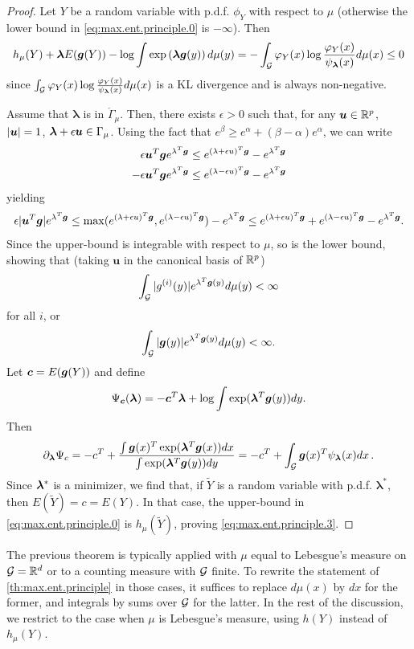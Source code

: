 \begin{proof}


Let $Y$ be a random variable with p.d.f. $\phi_Y$ with respect to $\mu$ (otherwise the lower bound in \cref{eq:max.ent.principle.0} is $-\infty$). 
Then
\[
h_\mu(Y) + \bm{\lambda} E({\bm{g}}(Y)) - \log \int \exp\left(\bm{\lambda} {\bm{g}}(y)\right) d\mu(y) = - \int_{\mathcal G} \varphi_Y(x) \log \frac{\varphi_Y(x)}{\psi_{\bm\lambda}(x)} d\mu(x) \leq 0
\]
since $\int_{\mathcal G} \varphi_Y(x) \log \frac{\varphi_Y(x)}{\psi_{\bm\lambda}(x)} d\mu(x)$ is a KL divergence and is always non-negative.

Assume that $\boldsymbol\lambda$ is in $\mathring \Gamma_\mu$. Then, there exists $\epsilon > 0$ such that, for any ${\bm{u}}\in {\mathbb{R}}^p$, $|{\bm{u}}|=1$, $\bm\lambda + \epsilon {\bm{u}}\in \Gamma_\mu$. Using the fact that $e^\beta \geq e^\alpha + (\beta-\alpha)e^\alpha$, we can write
\begin{align*}
\epsilon {\bm{u}}^T {\bm{g}} e^{\lambda^T {\bm{g}}} &\leq e^{(\lambda+\epsilon u)^T{\bm{g}}} - e^{\lambda^T {\bm{g}}}\\
-\epsilon {\bm{u}}^T {\bm{g}} e^{\lambda^T {\bm{g}}} &\leq e^{(\lambda-\epsilon u)^T{\bm{g}}} - e^{\lambda^T {\bm{g}}}
\end{align*}
yielding
\[
\epsilon |{\bm{u}}^T {\bm{g}}| e^{\lambda^T {\bm{g}}} \leq \max(e^{(\lambda+\epsilon u)^T{\bm{g}}}, e^{(\lambda-\epsilon u)^T{\bm{g}}}) - e^{\lambda^T {\bm{g}}} \leq e^{(\lambda+\epsilon u)^T{\bm{g}}} + e^{(\lambda-\epsilon u)^T{\bm{g}}} - e^{\lambda^T {\bm{g}}}.
\]
Since the upper-bound is integrable with respect to $\mu$, so is the lower bound, showing that (taking $\boldsymbol u$ in the canonical basis of ${\mathbb{R}}^p$)
\[
\int_{\mathcal G} |g^{(i)}(y)| e^{\lambda^T {\bm{g}}(y)}d\mu(y) <\infty
\]
for all $i$, or
\[
\int_{\mathcal G} |\bm g(y)| e^{\lambda^T {\bm{g}}(y)}d\mu(y) <\infty.
\]
Let ${\bm{c}} = E({\bm{g}}(Y))$ and define
\begin{equation}
\Psi_{\bm c}(\bm{\lambda}) = - {\bm c}^T\bm{\lambda} +  \log \int \exp(\bm{\lambda}^T\bm g(y)) dy.
\label{eq:max.ent.psi}
\end{equation} 
Then
\[
\partial_{\bm\lambda} \Psi_c = - c^T + \frac{\int \bm g(x)^T\exp(\bm{\lambda}^T\bm g(x)) dx}{\int \exp(\bm{\lambda}^T\bm g(y)) dy}
= -c^T + \int_{{\mathcal G}} \bm g(x)^T \psi_{\bm\lambda}(x) dx\,.
\]
Since $\bm {\lambda}^*$ is a minimizer, we find that,  if $\tilde Y$ is a random variable with p.d.f. $\boldsymbol\lambda^*$, then $E(\tilde Y) = c = E(Y)$. In that case, the upper-bound in \cref{eq:max.ent.principle.0} is $h_\mu(\tilde Y)$, proving \cref{eq:max.ent.principle.3}.
\end{proof}
\begin{remark}
The previous theorem is typically applied with $\mu$ equal to Lebesgue's measure on ${\mathcal G} = {\mathbb{R}}^d$ or to a counting measure with ${\mathcal G}$  finite. To rewrite the statement of \cref{th:max.ent.principle} in those cases, it suffices to replace $d\mu(x)$ by $dx$ for the former, and integrals by sums over ${\mathcal G}$ for the latter. In the rest of the discussion, we restrict to the case when $\mu$ is Lebesgue's measure,  using $h(Y)$ instead of $h_\mu(Y)$.
\end{remark}

